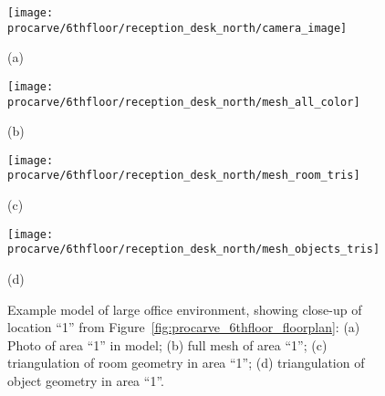 \documentclass[12pt,onecolumn,oneside]{book}
\begin{document}
\begin{figure}[t]

	\centering
	\begin{minipage}[t]{0.45\linewidth}
		\centerline{\texttt{[image: procarve/6thfloor/reception\_desk\_north/camera\_image]}}
		\centerline{(a)}
	\end{minipage}
	\hfill
	\begin{minipage}[t]{0.45\linewidth}
		\centerline{\texttt{[image: procarve/6thfloor/reception\_desk\_north/mesh\_all\_color]}}
		\centerline{(b)}
	\end{minipage}
	\hfill
	\begin{minipage}[t]{0.45\linewidth}
		\centerline{\texttt{[image: procarve/6thfloor/reception\_desk\_north/mesh\_room\_tris]}}
		\centerline{(c)}
	\end{minipage}
	\hfill
	\begin{minipage}[t]{0.45\linewidth}
		\centerline{\texttt{[image: procarve/6thfloor/reception\_desk\_north/mesh\_objects\_tris]}}
		\centerline{(d)}
	\end{minipage}

	\caption[Example model of large office environment, showing close-up of desk.]{Example model of large office environment, showing close-up of location ``1'' from Figure~\ref{fig:procarve_6thfloor_floorplan}:  (a) Photo of area ``1'' in model; (b) full mesh of area ``1''; (c) triangulation of room geometry in area ``1''; (d) triangulation of object geometry in area ``1''.}
	\label{fig:procarve_6thfloor_desk}

\end{figure}
\end{document}
